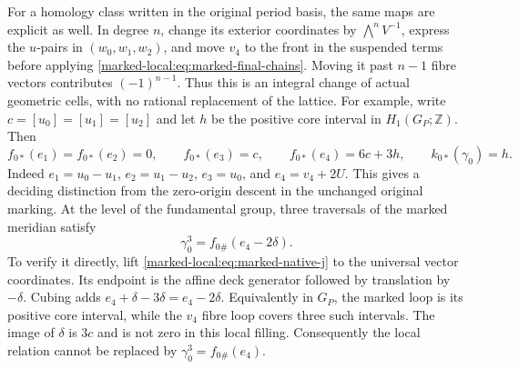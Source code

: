 For a homology class written in the original period basis, the
same maps are explicit as well. In degree $n$, change its exterior
coordinates by $\bigwedge^nV^{-1}$, express the $u$-pairs in
$(w_0,w_1,w_2)$, and move $v_4$ to the front in the suspended
terms before applying \eqref{marked-local:eq:marked-final-chains}. Moving it
past $n-1$ fibre vectors contributes $(-1)^{n-1}$.
Thus this is an integral change of actual geometric
cells, with no rational replacement of the lattice.
For example, write $c=[u_0]=[u_1]=[u_2]$ and let $h$ be the
positive core interval in $H_1(G_P;\mathbb Z)$. Then
\begin{equation}\label{marked-local:eq:marked-degree-one}
 f_{0*}(e_1)=f_{0*}(e_2)=0,\qquad
 f_{0*}(e_3)=c,\qquad f_{0*}(e_4)=6c+3h,
 \qquad k_{0*}(\gamma_0)=h.
\end{equation}
Indeed $e_1=u_0-u_1$, $e_2=u_1-u_2$, $e_3=u_0$,
and $e_4=v_4+2U$. This gives a deciding distinction from the
zero-origin descent in the unchanged original marking.
At the level of the fundamental group, three traversals of
the marked meridian satisfy
\begin{equation}\label{marked-local:eq:marked-meridian-relation}
                   \gamma_0^3=f_{0\#}(e_4-2\delta).
\end{equation}
To verify it directly, lift \eqref{marked-local:eq:marked-native-j} to the
universal vector coordinates. Its endpoint is the affine deck
generator followed by translation by $-\delta$. Cubing adds
$e_4+\delta-3\delta=e_4-2\delta$. Equivalently in $G_P$, the
marked loop is its positive core interval, while the $v_4$ fibre
loop covers three such intervals. The image of $\delta$ is
$3c$ and is not zero in this local filling. Consequently the
local relation cannot be replaced by $\gamma_0^3=f_{0\#}(e_4)$.

